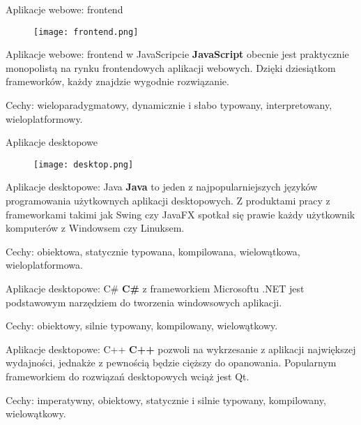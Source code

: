 \begin{frame}{Aplikacje webowe: frontend}		
	\begin{figure}
		\centering
		\texttt{[image: frontend.png]}
	\end{figure}
\end{frame}

\begin{frame}{Aplikacje webowe: frontend w JavaScripcie}		
	\textbf{JavaScript} obecnie jest praktycznie monopolistą na rynku frontendowych aplikacji webowych. Dzięki dziesiątkom frameworków, każdy znajdzie wygodnie rozwiązanie.
	
	Cechy: wieloparadygmatowy, dynamicznie i słabo typowany, interpretowany, wieloplatformowy.
\end{frame}

\begin{frame}{Aplikacje desktopowe}		
	\begin{figure}
		\centering
		\texttt{[image: desktop.png]}
	\end{figure}
\end{frame}

\begin{frame}{Aplikacje desktopowe: Java}		
	\textbf{Java} to jeden z najpopularniejszych języków programowania użytkownych aplikacji desktopowych. Z produktami pracy z frameworkami takimi jak Swing czy JavaFX spotkał się prawie każdy użytkownik komputerów z Windowsem czy Linuksem.
	
	Cechy: obiektowa, statycznie typowana, kompilowana, wielowątkowa, wieloplatformowa.
\end{frame}

\begin{frame}{Aplikacje desktopowe: C\#}		
	\textbf{C\#} z frameworkiem Microsoftu .NET jest podstawowym narzędziem do tworzenia windowsowych aplikacji.
	
	Cechy: obiektowy, silnie typowany, kompilowany, wielowątkowy.
\end{frame}

\begin{frame}{Aplikacje desktopowe: C++}		
	\textbf{C++} pozwoli na wykrzesanie z aplikacji największej wydajności, jednakże z pewnością będzie cięższy do opanowania. Popularnym frameworkiem do rozwiązań desktopowych wciąż jest Qt.
	
	Cechy: imperatywny, obiektowy, statycznie i silnie typowany, kompilowany, wielowątkowy.
\end{frame}

